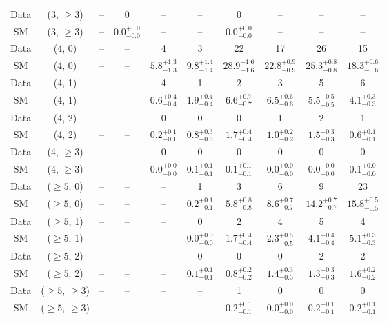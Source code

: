 \begin{table}[h!]
{\begin{tabular}{cccccccccc}
	Data & (3, $\ge3$) & -- & 0 & -- & -- & 0 & -- & -- & -- \\[0.5ex] 
	SM & (3, $\ge3$) & -- & $0.0^{+ 0.0 }_{- 0.0 }$ & -- & -- & $0.0^{+ 0.0 }_{- 0.0 }$ & -- & -- & -- \\[0.5ex] 
	Data & (4, 0) & -- & -- & 4 & 3 & 22 & 17 & 26 & 15 \\[0.5ex] 
	SM & (4, 0) & -- & -- & $5.8^{+ 1.3 }_{- 1.3 }$ & $9.8^{+ 1.4 }_{- 1.4 }$ & $28.9^{+ 1.6 }_{- 1.6 }$ & $22.8^{+ 0.9 }_{- 0.9 }$ & $25.3^{+ 0.8 }_{- 0.8 }$ & $18.3^{+ 0.6 }_{- 0.6 }$ \\[0.5ex] 
	Data & (4, 1) & -- & -- & 4 & 1 & 2 & 3 & 5 & 6 \\[0.5ex] 
	SM & (4, 1) & -- & -- & $0.6^{+ 0.4 }_{- 0.4 }$ & $1.9^{+ 0.4 }_{- 0.4 }$ & $6.6^{+ 0.7 }_{- 0.7 }$ & $6.5^{+ 0.6 }_{- 0.6 }$ & $5.5^{+ 0.5 }_{- 0.5 }$ & $4.1^{+ 0.3 }_{- 0.3 }$ \\[0.5ex] 
	Data & (4, 2) & -- & -- & 0 & 0 & 0 & 1 & 2 & 1 \\[0.5ex] 
	SM & (4, 2) & -- & -- & $0.2^{+ 0.1 }_{- 0.1 }$ & $0.8^{+ 0.3 }_{- 0.3 }$ & $1.7^{+ 0.4 }_{- 0.4 }$ & $1.0^{+ 0.2 }_{- 0.2 }$ & $1.5^{+ 0.3 }_{- 0.3 }$ & $0.6^{+ 0.1 }_{- 0.1 }$ \\[0.5ex] 
	Data & (4, $\ge3$) & -- & -- & 0 & 0 & 0 & 0 & 0 & 0 \\[0.5ex] 
	SM & (4, $\ge3$) & -- & -- & $0.0^{+ 0.0 }_{- 0.0 }$ & $0.1^{+ 0.1 }_{- 0.1 }$ & $0.1^{+ 0.1 }_{- 0.1 }$ & $0.0^{+ 0.0 }_{- 0.0 }$ & $0.0^{+ 0.0 }_{- 0.0 }$ & $0.1^{+ 0.0 }_{- 0.0 }$ \\[0.5ex] 
	Data & ($\ge5$, 0) & -- & -- & -- & 1 & 3 & 6 & 9 & 23 \\[0.5ex] 
	SM & ($\ge5$, 0) & -- & -- & -- & $0.2^{+ 0.1 }_{- 0.1 }$ & $5.8^{+ 0.8 }_{- 0.8 }$ & $8.6^{+ 0.7 }_{- 0.7 }$ & $14.2^{+ 0.7 }_{- 0.7 }$ & $15.8^{+ 0.5 }_{- 0.5 }$ \\[0.5ex] 
	Data & ($\ge5$, 1) & -- & -- & -- & 0 & 2 & 4 & 5 & 4 \\[0.5ex] 
	SM & ($\ge5$, 1) & -- & -- & -- & $0.0^{+ 0.0 }_{- 0.0 }$ & $1.7^{+ 0.4 }_{- 0.4 }$ & $2.3^{+ 0.5 }_{- 0.5 }$ & $4.1^{+ 0.4 }_{- 0.4 }$ & $5.1^{+ 0.3 }_{- 0.3 }$ \\[0.5ex] 
	Data & ($\ge5$, 2) & -- & -- & -- & 0 & 0 & 0 & 2 & 2 \\[0.5ex] 
	SM & ($\ge5$, 2) & -- & -- & -- & $0.1^{+ 0.1 }_{- 0.1 }$ & $0.8^{+ 0.2 }_{- 0.2 }$ & $1.4^{+ 0.3 }_{- 0.3 }$ & $1.3^{+ 0.3 }_{- 0.3 }$ & $1.6^{+ 0.2 }_{- 0.2 }$ \\[0.5ex] 
	Data & ($\ge5$, $\ge3$) & -- & -- & -- & -- & 1 & 0 & 0 & 0 \\[0.5ex] 
	SM & ($\ge5$, $\ge3$) & -- & -- & -- & -- & $0.2^{+ 0.1 }_{- 0.1 }$ & $0.0^{+ 0.0 }_{- 0.0 }$ & $0.2^{+ 0.1 }_{- 0.1 }$ & $0.2^{+ 0.1 }_{- 0.1 }$ \\[0.5ex] 
	\hline
	\hline
\end{tabular}}
\end{table}
